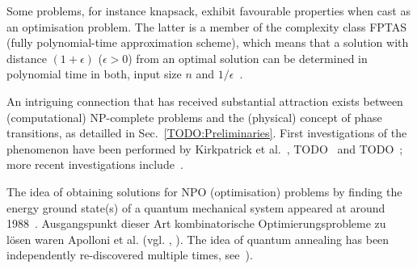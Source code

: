 \documentclass[runningheads]{llncs}
\begin{document}
Some problems, for instance knapsack, exhibit favourable properties
when cast as an optimisation problem. The latter is a member of the
complexity class FPTAS (fully polynomial-time approximation scheme),
which means that a solution with distance \((1+\epsilon)\) ($\epsilon > 0$)
from an optimal solution can be determined in polynomial time in both,
input size \(n\) and \(1/\epsilon\)~\cite{chen1995chaotic}.

An intriguing connection that has received substantial attraction exists between (computational) NP-complete problems and the (physical) concept of phase transitions, as detailled in Sec.~\ref{TODO:Preliminaries}. First investigations of the phenomenon have been performed by Kirkpatrick et al.~\cite{kirkpatrick1994critical}, TODO~\cite{TODO monasson1999determining} and TODO~\cite{TODO}; more recent investigations include~\cite{TODO, TODO, TODO}.

The idea of obtaining solutions for NPO (optimisation) problems by finding the energy ground state(s) of a quantum mechanical system appeared at around 1988~\cite{TODO: Originalpaper,albash2016adiabatic}. Ausgangspunkt dieser Art kombinatorische Optimierungsprobleme zu lösen waren Apolloni et al. (vgl. \cite{apolloni1989quantum}, \cite{apolloni1988numerical}). The idea of quantum annealing has been independently re-discovered multiple times, see~\cite{albash2016adiabatic,finnila1994quantum,amara1993global,kadowaki1998quantum}).
\end{document}

